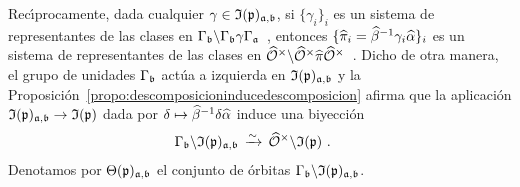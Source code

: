Rec\'{\i}procamente, dada cualquier
$\gamma\in\frak{I}(\frak{p})_{\frak{a},\frak{b}}$, si $\{\gamma_{i}\}_{i}$ es un
sistema de representantes de las clases en
\begin{math}
	\Gamma_{\frak{b}}\backslash\Gamma_{\frak{b}}\gamma\Gamma_{\frak{a}}
\end{math}~,
entonces $\{\hhat{\pi}_{i}=\hhat{\beta}^{-1}\gamma_{i}\hhat{\alpha}\}_{i}$ es
un sistema de representantes de las clases en
\begin{math}
	\Idfin{\cal{O}}\backslash\Idfin{\cal{O}}\hhat{\pi}\Idfin{\cal{O}}
\end{math}~.
Dicho de otra manera, el grupo de unidades $\Gamma_{\frak{b}}$ act\'{u}a a
izquierda en $\frak{I}(\frak{p})_{\frak{a},\frak{b}}$ y la
Proposici\'{o}n~\ref{propo:descomposicioninducedescomposicion} afirma que la
aplicaci\'{o}n
\begin{math}
	\frak{I}(\frak{p})_{\frak{a},\frak{b}}\rightarrow
		\frak{I}(\frak{p})
\end{math}
dada por $\delta\mapsto\hhat{\beta}^{-1}\delta\hhat{\alpha}$ induce una
biyecci\'{o}n
\begin{align*}
	& \Gamma_{\frak{b}}\backslash\frak{I}(\frak{p})_{\frak{a},\frak{b}}
		\,\xrightarrow{\sim}\,
		\Idfin{\cal{O}}\backslash\frak{I}(\frak{p})
	\text{ .}
\end{align*}
%
Denotamos por $\Theta(\frak{p})_{\frak{a},\frak{b}}$ el conjunto de \'{o}rbitas
$\Gamma_{\frak{b}}\backslash\frak{I}(\frak{p})_{\frak{a},\frak{b}}$.

